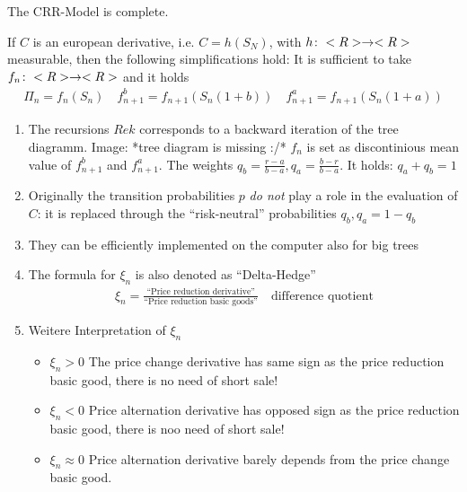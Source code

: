 \begin{conclusion}
	The CRR-Model is complete.
\end{conclusion}
\begin{conclusion}
	If $C$ is an european derivative, i.e. $C = h(S_N)$, with $h\colon <R> \to <R>$ measurable, then the following simplifications hold: It is sufficient to take $f_n \colon <R> \to <R>$ and it holds
	\begin{align*}
		\Pi_n = f_n(S_n) \quad f_{n+1}^b = f_{n+1}(S_n(1+b)) \quad f^a_{n+1} = f_{n+1}(S_n(1+a))
	\end{align*}
\end{conclusion}
\begin{*remark}
	\begin{enumerate}
		\item The recursions $Rek$ corresponds to a backward iteration of the tree diagramm. Image: *tree diagram is missing :/* $f_n$ is set as discontinious mean value of $f^b_{n+1}$ and $f^a_{n+1}$. The weights $q_b = \frac{r-a}{b-a},q_a = \frac{b-r}{b-a}$. It holds: $q_a + q_b = 1$
		\item Originally the transition probabilities $p$ \emph{do not} play a role in the evaluation of $C$: it is replaced through the ``risk-neutral'' probabilities $q_b, q_a = 1-q_b$
		\item They can be efficiently implemented on the computer also for big trees
		\item The formula for $\xi_n$ is also denoted as ``Delta-Hedge''
		\begin{align*}
			\xi_n = \frac{\text{``Price reduction derivative''}}{\text{``Price reduction basic goods''}} \quad \text{difference quotient}
		\end{align*}
		\item Weitere Interpretation of $\xi_n$
		\begin{itemize}
			\item $\xi_n > 0$ The price change derivative has same sign as the price reduction basic good, there is no need of short sale!
			\item $\xi_n < 0$ Price alternation derivative has opposed sign as the price reduction basic good, there is noo need of short sale!
			\item $\xi_n \approx 0$ Price alternation derivative barely depends from the price change basic good. 
		\end{itemize}
	\end{enumerate}
\end{*remark}
